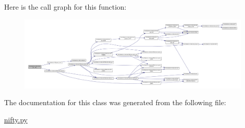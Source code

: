 Here is the call graph for this function\-:\nopagebreak
\begin{figure}[H]
\begin{center}
\leavevmode
\includegraphics[width=350pt]{classforcebalance_1_1nifty_1_1Pickler__LP_af59a709f44c96a91c753ce02cff07ae8_cgraph}
\end{center}
\end{figure}




The documentation for this class was generated from the following file\-:\begin{DoxyCompactItemize}
\item 
\hyperlink{nifty_8py}{nifty.\-py}\end{DoxyCompactItemize}
